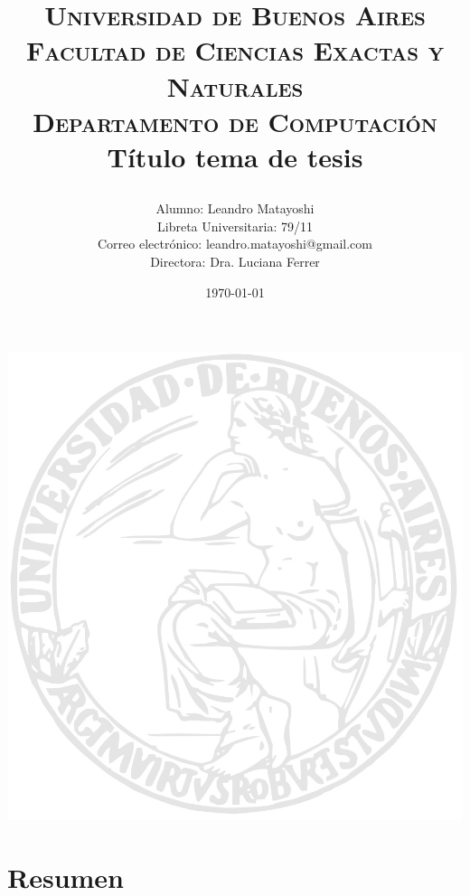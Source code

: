 \documentclass[a4paper,12pt]{article} %
\title{	
\normalfont \normalsize 
\textsc{Universidad de Buenos Aires \\ Facultad de Ciencias Exactas y Naturales \\ Departamento de Computaci\'on} \\ [25pt] %
\huge Título tema de tesis\\ %
\date{\today}
\vspace{20px}
}
\author{
	Alumno: Leandro Matayoshi \\ 
	Libreta Universitaria: 79/11 \\ 
	Correo electr\'onico: leandro.matayoshi@gmail.com \\ 
	Directora: Dra. Luciana Ferrer
	\vspace{10px}
}
\begin{document}

\begin{titlepage}
\maketitle
\begin{minipage}[t]{\textwidth}
    \begin{minipage}[t]{.55 \textwidth}
        \includegraphics{logo_uba.jpg}
    \end{minipage}%
\end{minipage}%
\end{titlepage}


\section{Resumen}

\end{document}
